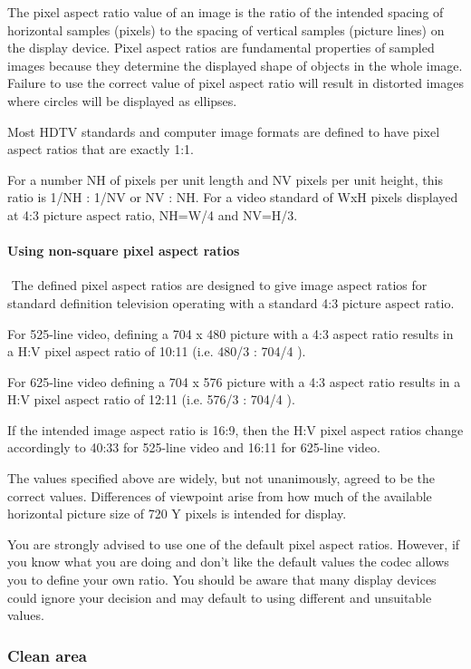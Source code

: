 \begin{informative*}
The pixel aspect ratio value of an image is the ratio of the intended spacing of
 horizontal samples (pixels) to the spacing of vertical samples (picture lines)
 on the display device. Pixel aspect ratios are fundamental properties of
sampled images because they determine the displayed shape of objects in the
 whole image. Failure to use the correct value of pixel aspect ratio will result
 in distorted images where circles will be displayed as ellipses.

Most HDTV standards and computer image formats are defined to have pixel aspect
 ratios that are exactly 1:1.

For a number NH of pixels per unit length and NV pixels per unit height, this
 ratio is 1/NH : 1/NV or NV : NH. For a video standard of WxH pixels displayed 
at 4:3 picture aspect ratio, NH=W/4 and NV=H/3.

\paragraph{Using non-square pixel aspect ratios}
$ $\newline
The defined pixel aspect ratios are designed to give image aspect ratios for
 standard definition television operating with a standard 4:3 picture aspect
 ratio.

For 525-line video, defining a 704 x 480 picture with a 4:3 aspect ratio results
 in a H:V pixel aspect ratio of 10:11 (i.e. 480/3 : 704/4 ).

For 625-line video defining a 704 x 576 picture with a 4:3 aspect ratio results
 in a H:V pixel aspect ratio of 12:11 (i.e. 576/3 : 704/4 ).

If the intended image aspect ratio is 16:9, then the H:V pixel aspect ratios
 change accordingly to 40:33 for 525-line video and 16:11 for 625-line video.

The values specified above are widely, but not unanimously, agreed to be the
 correct values. Differences of viewpoint arise from how much of the available
 horizontal picture size of 720 Y pixels is intended for display.

You are strongly advised to use one of the default pixel aspect ratios. However,
 if you know what you are doing and don’t like the default values the codec
 allows you to define your own ratio. You should be aware that many display
devices could ignore your decision and may default to using different and
 unsuitable values.

\subsubsection{Clean area}


\end{informative*}
